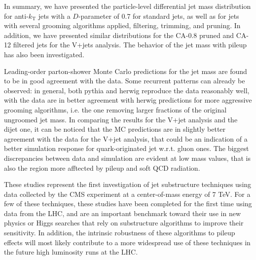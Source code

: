 \label{sec:summary}

In summary, we have presented the particle-level differential jet mass distribution for 
anti-$k_{\mathrm{T}}$ jets with a $D$-parameter of 0.7 for standard jets, as well as
for jets with several grooming algorithms applied,
filtering, trimming, and pruning. In addition, we have presented similar 
distributions for the CA-0.8 pruned and CA-12 filtered jets for the V+jets analysis. 
The behavior of the jet mass with pileup has also been
investigated.


Leading-order parton-shower Monte Carlo predictions for the jet mass are found to be in good agreement with the data. Some recurrent patterns can already be observed: in general, both pythia and herwig reproduce the data reasonably well, with the data are in better agreement with herwig predictions for more aggressive grooming algorithms, i.e. the one removing larger fractions of the original ungroomed jet mass. In comparing the results for the V+jet analysis and the dijet one, it can be noticed that the MC predictions are in slightly better agreement with the data for the V+jet analysis, that could be an indication of a better simulation response for quark-originated jet w.r.t. gluon ones. The biggest discrepancies between data and simulation are evident at low mass values, that is also the region more afftected by pileup and soft QCD radiation.

These studies represent the first investigation of jet substructure techniques using data collected by the CMS experiment at a center-of-mass energy of 7 TeV. For a few of these techniques, these studies have been completed for the first time using data from the LHC, and are an important benchmark toward their use in new physics or Higgs searches that rely on substructure algorithms to improve their sensitivity. In addition, the intrinsic robustness of these algorithms to pileup effects will most likely contribute to a more widespread use of these techniques in the future high luminosity runs at the LHC.

